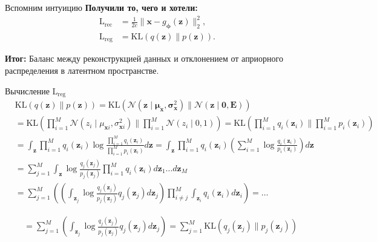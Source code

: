 \begin{frame}{Вспомним интуицию}
    \textbf{Получили то, чего и хотели:}
    \begin{align*}
        \text{L}_{\text{rec}} & = \frac{1}{2c}\|\boldsymbol{x} - g_{\boldsymbol{\phi}}(\boldsymbol{z})\|^2_2, \\
        \text{L}_{\text{reg}} & = \text{KL}(q(\boldsymbol{z}) \parallel p(\boldsymbol{z})).
    \end{align*}

    \textbf{Итог:}
    Баланс между реконструкцией данных и отклонением от априорного распределения в латентном пространстве.
\end{frame}

\begin{frame}[allowframebreaks]{Вычисление $\text{L}_{\text{reg}}$}
    \begin{align*}
        & \text{KL}(q(\boldsymbol{z}) \parallel p(\boldsymbol{z})) = \text{KL}\left(\boldsymbol{\mathcal{N}}(\boldsymbol{z} \mid \boldsymbol{\mu}_{\boldsymbol{x}}, \boldsymbol{\sigma}_{\boldsymbol{x}}^2) \parallel \boldsymbol{\mathcal{N}}(\boldsymbol{z} \mid \mathbf{0}, \mathbf{E})\right) \\
        &= \text{KL}\left(\prod_{i=1}^M\boldsymbol{\mathcal{N}}(z_i \mid \mu_{\boldsymbol{x}i}, \sigma_{\boldsymbol{x}i}^2) \parallel \prod_{i=1}^M\boldsymbol{\mathcal{N}}(z_i \mid 0, 1)\right) = \text{KL}\left(\prod_{i=1}^Mq_i(\boldsymbol{z}_i) \parallel \prod_{i=1}^Mp_i(\boldsymbol{z}_i)\right) \\
        &= \int_{\boldsymbol{z}} \prod_{i=1}^Mq_i(\boldsymbol{z}_i)\log\frac{\prod_{i=1}^Mq_i(\boldsymbol{z}_i)}{\prod_{i=1}^Mp_i(\boldsymbol{z}_i)}d\boldsymbol{z} = \int_{\boldsymbol{z}} \prod_{i=1}^Mq_i(\boldsymbol{z}_i)\left(\sum_{i=1}^M\log \frac{q_i(\boldsymbol{z}_i)}{p_i(\boldsymbol{z}_i)}\right)d\boldsymbol{z} \\
        &= \sum_{j=1}^M\int_{\boldsymbol{z}} \log \frac{q_j(\boldsymbol{z}_j)}{p_j(\boldsymbol{z}_j)} \prod_{i=1}^Mq_i(\boldsymbol{z}_i) d\boldsymbol{z}_1\ldots d\boldsymbol{z}_M \\
        &= \sum_{j=1}^M \left( \left( \int_{\boldsymbol{z}_j} \log \frac{q_j(\boldsymbol{z}_j)}{p_j(\boldsymbol{z}_j)}q_j(\boldsymbol{z}_j) d\boldsymbol{z}_j \right) \prod_{i\neq j}^M \int_{\boldsymbol{z}_i} q_i(\boldsymbol{z}_i) d\boldsymbol{z}_i \right) = \ldots
    \end{align*}

    \begin{align*}
        &= \sum_{j=1}^M \left( \int_{\boldsymbol{z}_j} \log \frac{q_j(\boldsymbol{z}_j)}{p_j(\boldsymbol{z}_j)}q_j(\boldsymbol{z}_j) d\boldsymbol{z}_j \right) = \sum_{j=1}^M \text{KL}(q_j(\boldsymbol{z}_j) \parallel p_j(\boldsymbol{z}_j))
    \end{align*}


\end{frame}
